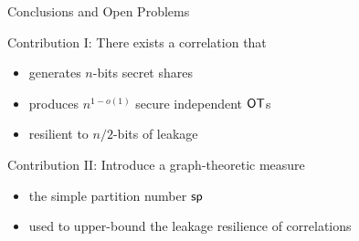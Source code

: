 \begin{frame}{Conclusions and Open Problems}

	{
		\begin{block} {Contribution I: There exists a correlation that}
			\begin{itemize}
				\item generates $ n $-bits secret shares
				\item produces $ n^{1-o(1)} $ secure independent $\OT$s
				\item resilient to $ n/2 $-bits of leakage 
			\end{itemize}
		\end{block}
		
		\pause
		
		\begin{block} {Contribution II: Introduce a graph-theoretic measure}
			\begin{itemize}
				\item the simple partition number $ \mathsf{sp} $
				\item used to upper-bound the leakage resilience of correlations 
			\end{itemize}
		\end{block}
		
	}


\end{frame}
